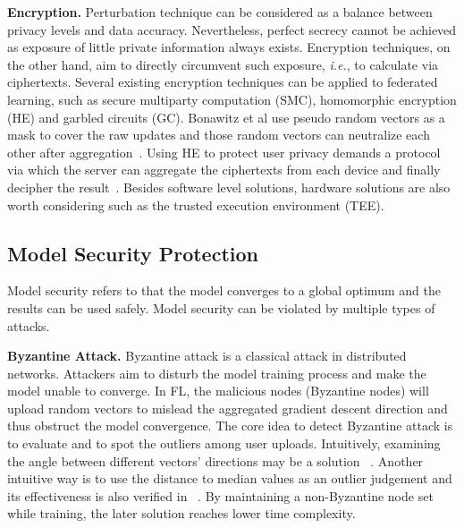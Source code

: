 \documentclass[11pt]{article}
\newcommand{\ie}{\textit{i.e.}\xspace}
\newcommand{\fakeparagraph}[1]{\vspace{1mm}\noindent\textbf{#1.}}
\begin{document}
\fakeparagraph{Encryption}
Perturbation technique can be considered as a balance between privacy levels and data accuracy. Nevertheless, perfect secrecy cannot be achieved as exposure of little private information always exists. 
Encryption techniques, on the other hand, aim to directly circumvent such exposure, \ie, to calculate via ciphertexts. Several existing encryption techniques can be applied to federated learning, such as secure multiparty computation (SMC), homomorphic encryption (HE) and garbled circuits (GC).
Bonawitz et al use pseudo random vectors as a mask to cover the raw updates and those random vectors can neutralize each other after aggregation~\cite{DBLP:conf/ccs/BonawitzIKMMPRS17}.
Using HE to protect user privacy demands a protocol via which the server can aggregate the ciphertexts from each device and finally decipher the result~\cite{DBLP:journals/tifs/ErkinVTL12}.
Besides software level solutions, hardware solutions are also worth considering such as the trusted execution environment (TEE).

\subsection{Model Security Protection}
Model security refers to that the model converges to a global optimum and the results can be used safely.
Model security can be violated by multiple types of attacks.

\fakeparagraph{Byzantine Attack} 
Byzantine attack is a classical attack in distributed networks. Attackers aim to disturb the model training process and make the model unable to converge.
In FL, the malicious nodes (Byzantine nodes) will upload random vectors to mislead the aggregated gradient descent direction and thus obstruct the model convergence. 
The core idea to detect Byzantine attack is to evaluate and to spot the outliers among user uploads. 
Intuitively, examining the angle between different vectors' directions may be a solution ~\cite{DBLP:conf/nips/BlanchardMGS17}.
Another intuitive way is to use the distance to median values as an outlier judgement and its effectiveness is also verified in ~\cite{DBLP:conf/nips/AlistarhA018}. 
By maintaining a non-Byzantine node set while training, the later solution reaches lower time complexity. 
\end{document}
